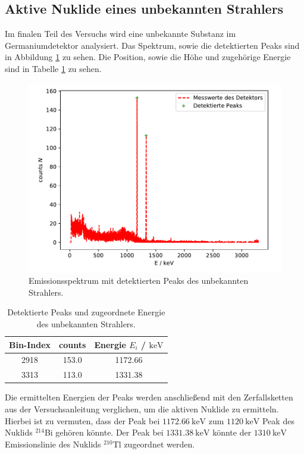 \subsection{Aktive Nuklide eines unbekannten Strahlers}
Im finalen Teil des Versuchs wird eine unbekannte Substanz im Germaniumdetektor analysiert. Das Spektrum, sowie die detektierten Peaks sind in Abbildung \ref{abb:unbekannt} zu sehen. Die Position, sowie die Höhe und zugehörige Energie sind in Tabelle \ref{tab:unbekannt} zu sehen.
\FloatBarrier
\begin{figure}
    \centering
    \includegraphics[scale=0.7]{unbekannterStrahler.pdf}
    \caption{Emissionsspektrum mit detektierten Peaks des unbekannten Strahlers.}
    \label{abb:unbekannt}
\end{figure}
\FloatBarrier
\begin{table}
    \centering
    \caption{Detektierte Peaks und zugeordnete Energie des unbekannten Strahlers.}
    \label{tab:unbekannt}
    \begin{tabular}{ c c c }
    \toprule
    {Bin-Index} & {counts } & {Energie $E_i$ / $\si{\kilo\electronvolt}$}\\
    \midrule
    2918 & 153.0 & 1172.66       \\
    3313 & 113.0 & 1331.38       \\
    \bottomrule
    \end{tabular}
\end{table}
\FloatBarrier

\noindent Die ermittelten Energien der Peaks werden anschließend mit den Zerfallsketten aus der Versuchsanleitung \cite{Q1} verglichen, um die aktiven Nuklide zu ermitteln.
Hierbei ist zu vermuten, dass der Peak bei $\SI{1172,66}{\kilo\electronvolt}$
zum $\SI{1120}{\kilo\electronvolt}$ Peak des Nuklids $^{214}$Bi gehören könnte. Der Peak bei $\SI{1331.38}{\kilo\electronvolt}$ könnte der $\SI{1310}{\kilo\electronvolt}$ Emissionslinie des Nuklids $^{210}$Tl zugeordnet werden.

